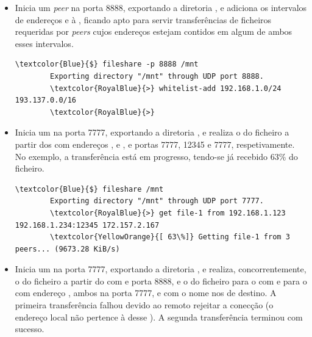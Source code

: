 \begin{itemize}[noitemsep]

    \item Inicia um \emph{peer} na porta 8888, exportando a diretoria , e adiciona os intervalos de endereços  e  à , ficando apto para servir transferências de ficheiros requeridas por \emph{peers} cujos endereços estejam contidos em algum de ambos esses intervalos.

    \vspace*{.9\baselineskip}
    \begin{Verbatim}[breaklines,gobble=8,frame=leftline,framesep=8pt,xleftmargin=11pt,commandchars=\\\{\}]
        \textcolor{Blue}{$} fileshare -p 8888 /mnt
        Exporting directory "/mnt" through UDP port 8888.
        \textcolor{RoyalBlue}{>} whitelist-add 192.168.1.0/24 193.137.0.0/16
        \textcolor{RoyalBlue}{>}
    \end{Verbatim}
    \vspace*{.9\baselineskip}

    \item Inicia um  na porta 7777, exportando a diretoria , e realiza o  do ficheiro  a partir dos  com endereços ,  e , e portas 7777, 12345 e 7777, respetivamente. No exemplo, a transferência está em progresso, tendo-se já recebido 63\% do ficheiro.

    \vspace*{.9\baselineskip}
    \begin{Verbatim}[breaklines,gobble=8,frame=leftline,framesep=8pt,xleftmargin=11pt,commandchars=\\\{\}]
        \textcolor{Blue}{$} fileshare /mnt
        Exporting directory "/mnt" through UDP port 7777.
        \textcolor{RoyalBlue}{>} get file-1 from 192.168.1.123 192.168.1.234:12345 172.157.2.167
        \textcolor{YellowOrange}{[ 63\%]} Getting file-1 from 3 peers... (9673.28 KiB/s)
    \end{Verbatim}
    \vspace*{.9\baselineskip}

    \item Inicia um  na porta 7777, exportando a diretoria , e realiza, concorrentemente,  o  do ficheiro  a partir do  com   e porta 8888, e  o  do ficheiro  para o  com   e para o  com endereço , ambos na porta 7777, e com o nome  nos  de destino. A primeira transferência falhou devido ao  remoto rejeitar a conecção (o endereço local não pertence à  desse ). A segunda transferência terminou com sucesso.


\end{itemize}

